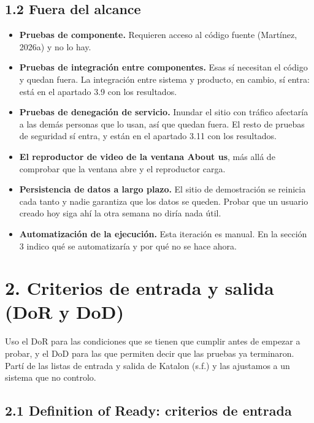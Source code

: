 \documentclass[11pt,a4paper]{article}
\begin{document}
\subsection*{1.2 Fuera del alcance}

\begin{itemize}
  \item \textbf{Pruebas de componente.} Requieren acceso al código fuente
        (Martínez, 2026a) y no lo hay.
  \item \textbf{Pruebas de integración entre componentes.} Esas sí necesitan el
        código y quedan fuera. La integración entre sistema y producto, en cambio,
        sí entra: está en el apartado 3.9 con los resultados.
  \item \textbf{Pruebas de denegación de servicio.} Inundar el sitio con tráfico
        afectaría a las demás personas que lo usan, así que quedan fuera. El resto
        de pruebas de seguridad sí entra, y están en el apartado 3.11 con los
        resultados.
  \item \textbf{El reproductor de video de la ventana About us}, más allá de
        comprobar que la ventana abre y el reproductor carga.
  \item \textbf{Persistencia de datos a largo plazo.} El sitio de demostración se
        reinicia cada tanto y nadie garantiza que los datos se queden. Probar que un
        usuario creado hoy siga ahí la otra semana no diría nada útil.
  \item \textbf{Automatización de la ejecución.} Esta iteración es manual. En la
        sección 3 indico qué se automatizaría y por qué no se hace ahora.
\end{itemize}

\FloatBarrier
\section*{2. Criterios de entrada y salida (DoR y DoD)}

Uso el DoR para las condiciones que se tienen que cumplir antes de empezar a
probar, y el DoD para las que permiten decir que las pruebas ya terminaron. Partí de
las listas de entrada y salida de Katalon (s.f.) y las ajustamos a un sistema que no
controlo.

\subsection*{2.1 Definition of Ready: criterios de entrada}
\end{document}
